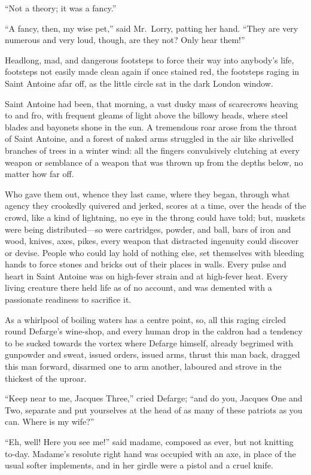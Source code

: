``Not a theory; it was a fancy.''

``A fancy, then, my wise pet,'' said Mr.\ Lorry, patting her hand.  ``They
are very numerous and very loud, though, are they not?  Only hear them!''

Headlong, mad, and dangerous footsteps to force their way into anybody's
life, footsteps not easily made clean again if once stained red, the
footsteps raging in Saint Antoine afar off, as the little circle sat
in the dark London window.

Saint Antoine had been, that morning, a vast dusky mass of scarecrows
heaving to and fro, with frequent gleams of light above the billowy
heads, where steel blades and bayonets shone in the sun.  A tremendous
roar arose from the throat of Saint Antoine, and a forest of naked arms
struggled in the air like shrivelled branches of trees in a winter wind:
all the fingers convulsively clutching at every weapon or semblance of
a weapon that was thrown up from the depths below, no matter how far off.

Who gave them out, whence they last came, where they began, through
what agency they crookedly quivered and jerked, scores at a time, over
the heads of the crowd, like a kind of lightning, no eye in the throng
could have told; but, muskets were being distributed---so were
cartridges, powder, and ball, bars of iron and wood, knives, axes,
pikes, every weapon that distracted ingenuity could discover or devise.
People who could lay hold of nothing else, set themselves with bleeding
hands to force stones and bricks out of their places in walls.  Every
pulse and heart in Saint Antoine was on high-fever strain and at
high-fever heat.  Every living creature there held life as of no account,
and was demented with a passionate readiness to sacrifice it.

As a whirlpool of boiling waters has a centre point, so, all this raging
circled round Defarge's wine-shop, and every human drop in the caldron
had a tendency to be sucked towards the vortex where Defarge himself,
already begrimed with gunpowder and sweat, issued orders, issued arms,
thrust this man back, dragged this man forward, disarmed one to arm
another, laboured and strove in the thickest of the uproar.

``Keep near to me, Jacques Three,'' cried Defarge; ``and do you,
Jacques One and Two, separate and put yourselves at the head of
as many of these patriots as you can.  Where is my wife?''

``Eh, well!  Here you see me!'' said madame, composed as ever, but not
knitting to-day.  Madame's resolute right hand was occupied with an axe,
in place of the usual softer implements, and in her girdle were a pistol
and a cruel knife.

